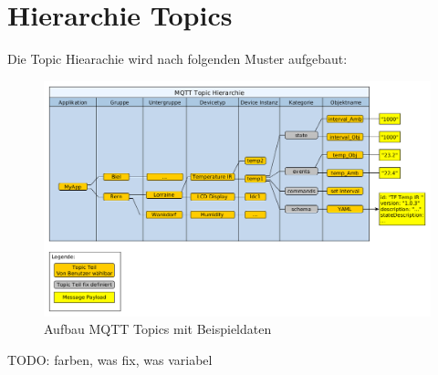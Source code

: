 \section{Hierarchie Topics}


Die Topic Hiearachie wird nach folgenden Muster aufgebaut:

\begin{figure}[H]
	\centering
		\includegraphics[width=1.0\textwidth]{diag/topic_hierarchy.png}
	\caption{\label{fig:tempitTopics}Aufbau MQTT Topics mit Beispieldaten}
\end{figure}
TODO: farben, was fix, was variabel

